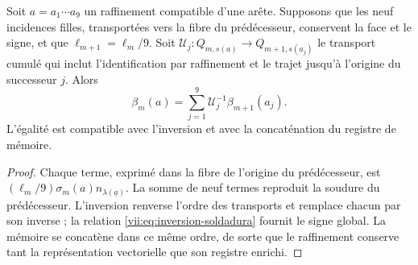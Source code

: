 \begin{proposition}
\label{vii:prop:refinamiento-soldadura}
Soit \(a=a_1\cdots a_9\) un raffinement compatible d’une arête.
Supposons que les neuf incidences filles, transportées vers la fibre du
prédécesseur, conservent la face et le signe, et que
\(\ell_{m+1}=\ell_m/9\). Soit
\(\mathcal U_j:Q_{m,s(a)}\longrightarrow Q_{m+1,s(a_j)}\)
le transport cumulé qui inclut l’identification par raffinement
et le trajet jusqu’à l’origine du successeur \(j\). Alors
\[
 \beta_m(a)=
 \sum_{j=1}^{9}\mathcal U_j^{-1}\beta_{m+1}(a_j).
\]
L'égalité est compatible avec l'inversion et avec la concaténation du registre de mémoire.
\end{proposition}

\begin{proof}
Chaque terme, exprimé dans la fibre de l’origine du prédécesseur, est
\((\ell_m/9)\sigma_m(a)n_{\lambda(\underline a)}\).
La somme de neuf termes reproduit la soudure du prédécesseur.
L’inversion renverse l’ordre des transports et remplace chacun
par son inverse ; la relation \eqref{vii:eq:inversion-soldadura} fournit
le signe global. La mémoire se concatène dans ce même ordre, de sorte
que le raffinement conserve tant la représentation vectorielle que son
registre enrichi.
\end{proof}
